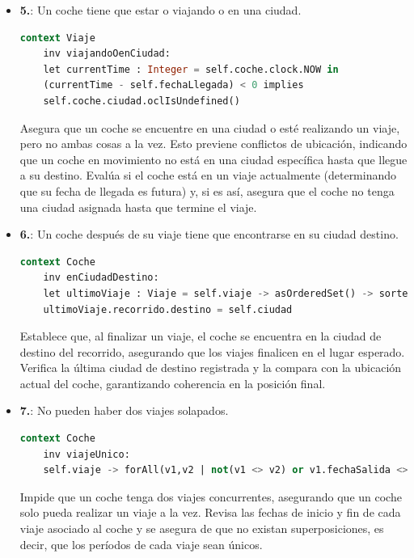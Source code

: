 \documentclass[12pt.a4paper]{article}
\begin{document}
\begin{itemize}
\begin{lstlisting}[style = useEspecifico,language=SQL]
    
\end{lstlisting}
    Asegura que un coche en revisión se encuentre en la misma ciudad que el taller donde se realiza la revisión. Esto garantiza que el coche y el taller están físicamente en el mismo lugar cuando se realiza el mantenimiento.
    Verifica la ciudad asociada al taller y la compara con la ciudad en la que se encuentra el coche en ese momento.
    
    \item \textbf{5.}: Un coche tiene que estar o viajando o en una ciudad.
    \begin{lstlisting}[style = useEspecifico,language=SQL]
  context Viaje
    inv viajandoOenCiudad:
    let currentTime : Integer = self.coche.clock.NOW in
    (currentTime - self.fechaLlegada) < 0 implies
    self.coche.ciudad.oclIsUndefined() 
    \end{lstlisting}
    Asegura que un coche se encuentre en una ciudad o esté realizando un viaje, pero no ambas cosas a la vez. Esto previene conflictos de ubicación, indicando que un coche en movimiento no está en una ciudad específica hasta que llegue a su destino.
    Evalúa si el coche está en un viaje actualmente (determinando que su fecha de llegada es futura) y, si es así, asegura que el coche no tenga una ciudad asignada hasta que termine el viaje.
    
    \item \textbf{6.}: Un coche después de su viaje tiene que encontrarse en su ciudad destino.
    \begin{lstlisting}[style = useEspecifico,language=SQL]
  context Coche
    inv enCiudadDestino:
    let ultimoViaje : Viaje = self.viaje -> asOrderedSet() -> sortedBy(fechaLlegada) -> last() in
    ultimoViaje.recorrido.destino = self.ciudad
    \end{lstlisting}
    Establece que, al finalizar un viaje, el coche se encuentra en la ciudad de destino del recorrido, asegurando que los viajes finalicen en el lugar esperado.
    Verifica la última ciudad de destino registrada y la compara con la ubicación actual del coche, garantizando coherencia en la posición final.
    
    \item \textbf{7.}: No pueden haber dos viajes solapados.
    \begin{lstlisting}[style = useEspecifico,language=SQL]
  context Coche
    inv viajeUnico:
    self.viaje -> forAll(v1,v2 | not(v1 <> v2) or v1.fechaSalida <> v2.fechaSalida and (v1.fechaLlegada <= v2.fechaSalida or v2.fechaLlegada <= v1.fechaSalida))
    \end{lstlisting}
    Impide que un coche tenga dos viajes concurrentes, asegurando que un coche solo pueda realizar un viaje a la vez.
    Revisa las fechas de inicio y fin de cada viaje asociado al coche y se asegura de que no existan superposiciones, es decir, que los períodos de cada viaje sean únicos.
    

\end{itemize}
\end{document}
